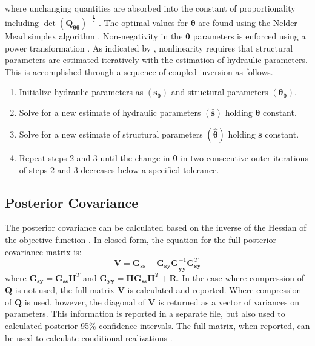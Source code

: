 \documentclass[11pt,oneside,onecolumn]{usgsreport}
\begin{document}
\begin{appendix}
where unchanging quantities are absorbed into the constant of proportionality
including $\det\left(\mathbf{Q}_{\mathbf{\theta\theta}}\right)^{-\frac{1}{2}}$
. The optimal values for $\mathbf{\theta}$ are found using the Nelder-Mead
simplex algorithm \citep[e.g. ][p. 408-410]{Press1992}. Non-negativity
in the $\mathbf{\theta}$ parameters is enforced using a power transformation
\citep{BoxCox1964}. As indicated by \citet{Kitanidis1995}, nonlinearity
requires that structural parameters are estimated iteratively with
the estimation of hydraulic parameters. This is accomplished through
a sequence of coupled inversion as follows.
\begin{enumerate}
\item Initialize hydraulic parameters as $\left(\mathbf{s_{0}}\right)$
and structural parameters $\left(\mathbf{\theta_{0}}\right)$. 
\item Solve for a new estimate of hydraulic parameters $\left(\hat{\mathbf{s}}\right)$
holding $\mathbf{\theta}$ constant. 
\item Solve for a new estimate of structural parameters $\left(\mathbf{\hat{\theta}}\right)$
holding $\mathbf{s}$ constant. 
\item Repeat steps 2 and 3 until the change in $\mathbf{\theta}$ in two
consecutive outer iterations of steps 2 and 3 decreases below a specified
tolerance. 
\end{enumerate}

\subsection{Posterior Covariance}

The posterior covariance can be calculated based on the inverse of
the Hessian of the objective function \citep[for example, ][]{NowakCirpka2004}.
In closed form, the equation for the full posterior covariance matrix
is:
\[
\mathbf{V}=\mathbf{\mathbf{G}_{ss}}-\mathbf{G_{sy}G}_{\mathbf{yy}}^{-1}\mathbf{G}_{\mathbf{sy}}^{T}
\]
 where $\mathbf{G_{sy}}=\mathbf{G_{ss}H}^{T}$ and $\mathbf{G_{yy}}=\mathbf{HG_{ss}H}^{T}+\mathbf{R}$.
In the case where compression of $\mathbf{Q}$ is not used, the full
matrix $\mathbf{V}$ is calculated and reported. Where compression
of $\mathbf{Q}$ is used, however, the diagonal of $\mathbf{V}$ is
returned as a vector of variances on parameters. This information
is reported in a separate file, but also used to calculated posterior
95\% confidence intervals. The full matrix, when reported, can be
used to calculate conditional realizations \citep{Kitanidis1995,Kitanidis1996ana}.



\end{appendix}
\end{document}
